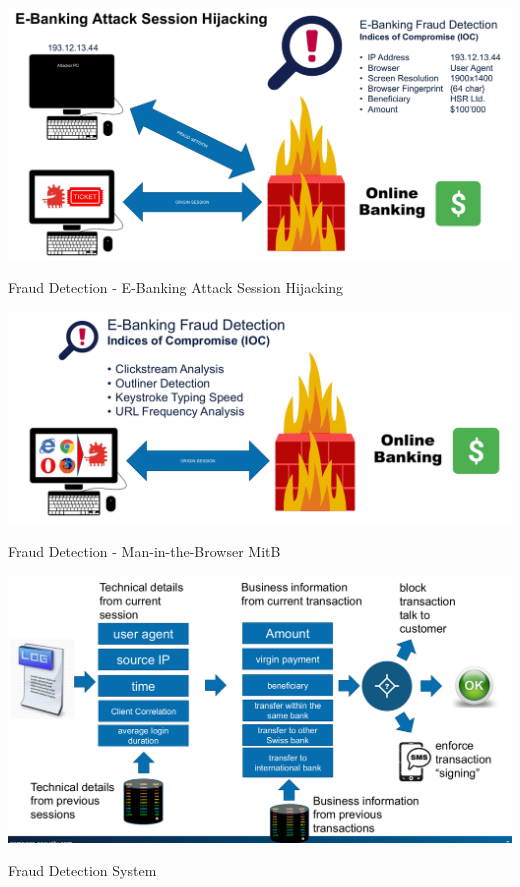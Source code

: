 \begin{table}[h]
  \centering
  \includegraphics[width=\textwidth]{resources/12-fraud-detection-2.png}
  \caption{Fraud Detection - E-Banking Attack Session Hijacking}
\end{table}

\begin{table}[h]
  \centering
  \includegraphics[width=\textwidth]{resources/12-fraud-detection-3.png}
  \caption{Fraud Detection - Man-in-the-Browser MitB}
\end{table}

\begin{table}[h]
  \centering
  \includegraphics[width=\textwidth]{resources/12-fraud-detection-system.png}
  \caption{Fraud Detection System}
\end{table}

